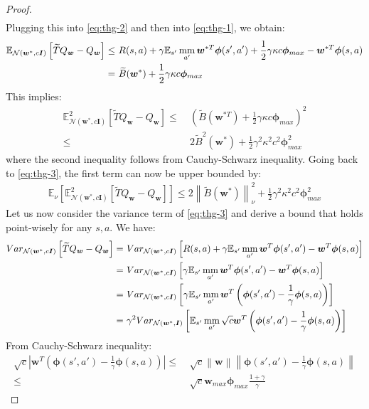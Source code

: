 \documentclass{article}
\newcommand{\mm}{\operatornamewithlimits{mm}}
\newcommand{\wt}[1]{\widetilde{#1}}
\newcommand{\norm}[1]{\left\lVert #1 \right\rVert}
\newcommand{\abs}[1]{\left\lvert #1 \right\rvert}
\begin{document}
\begin{proof}
\begin{align*}
\end{align*}
Plugging this into \ref{eq:thg-2} and then into \ref{eq:thg-1}, we obtain:
\begin{align*}
\mathbb{E}_{\mathcal{N}(\bm{w}^*,c\bm{I})}\left[\wt{T}Q_{\bm{w}}-Q_{\bm{w}}\right] \leq\ & R(s,a) + \gamma\mathbb{E}_{s'}\mm_{a'}\bm{w}^{*T}\bm{\phi}(s',a') + \frac{1}{2}\gamma\kappa c\bm{\phi}_{max} - \bm{w}^{*T}\bm{\phi}(s,a)\\ =\ & \wt{B}(\bm{w}^{*}) + \frac{1}{2}\gamma\kappa c\bm{\phi}_{max}
\end{align*}
This implies:
\begin{align*}
\mathbb{E}^2_{\mathcal{N}(\bm{w}^*,c\bm{I})}\left[\wt{T}Q_{\bm{w}}-Q_{\bm{w}}\right] \leq\ & \left(\wt{B}(\bm{w}^{*T}) + \frac{1}{2}\gamma\kappa c\bm{\phi}_{max}\right)^2\\ \leq\ & 2\wt{B}^2(\bm{w}^{*}) + \frac{1}{2}\gamma^2\kappa^2 c^2\bm{\phi}_{max}^2
\end{align*}
where the second inequality follows from Cauchy-Schwarz inequality. Going back to \ref{eq:thg-3}, the first term can now be upper bounded by:
\begin{align*}
\mathbb{E}_{\nu}\left[\mathbb{E}_{\mathcal{N}(\bm{w}^*,c\bm{I})}^2\left[\wt{T}Q_{\bm{w}}-Q_{\bm{w}}\right]\right] \leq 2\norm{\wt{B}(\bm{w}^{*})}_{\nu}^2 + \frac{1}{2}\gamma^2\kappa^2 c^2\bm{\phi}_{max}^2
\end{align*}
Let us now consider the variance term of \ref{eq:thg-3} and derive a bound that holds point-wisely for any $s,a$. We have:
\begin{align*}
Var_{\mathcal{N}(\bm{w}^*,c\bm{I})}\left[\wt{T}Q_{\bm{w}}-Q_{\bm{w}}\right] =\ & Var_{\mathcal{N}(\bm{w}^*,c\bm{I})}\left[R(s,a) + \gamma\mathbb{E}_{s'}\mm_{a'}\bm{w}^T\bm{\phi}(s',a') - \bm{w}^T\bm{\phi}(s,a)\right]\\ =\ & Var_{\mathcal{N}(\bm{w}^*,c\bm{I})}\left[\gamma\mathbb{E}_{s'}\mm_{a'}\bm{w}^T\bm{\phi}(s',a') - \bm{w}^T\bm{\phi}(s,a)\right]\\ =\ & Var_{\mathcal{N}(\bm{w}^*,c\bm{I})}\left[\gamma\mathbb{E}_{s'}\mm_{a'}\bm{w}^T\left(\bm{\phi}(s',a')-\frac{1}{\gamma}\bm{\phi}(s,a)\right)\right]\\ =\ & \gamma^2 Var_{\mathcal{N}(\bm{w}^*,\bm{I})}\left[\mathbb{E}_{s'}\mm_{a'}\sqrt{c}\bm{w}^T\left(\bm{\phi}(s',a')-\frac{1}{\gamma}\bm{\phi}(s,a)\right)\right]
\end{align*}
From Cauchy-Schwarz inequality:
\begin{align*}
\sqrt{c}\abs{\bm{w}^T\left(\bm{\phi}(s',a')-\frac{1}{\gamma}\bm{\phi}(s,a)\right)} \leq\ & \sqrt{c}\norm{\bm{w}}\norm{\bm{\phi}(s',a')-\frac{1}{\gamma}\bm{\phi}(s,a)}\\ \leq\ & \sqrt{c}\bm{w}_{max}\bm{\phi}_{max}\frac{1 + \gamma}{\gamma}

\end{align*}
\end{proof}
\end{document}
